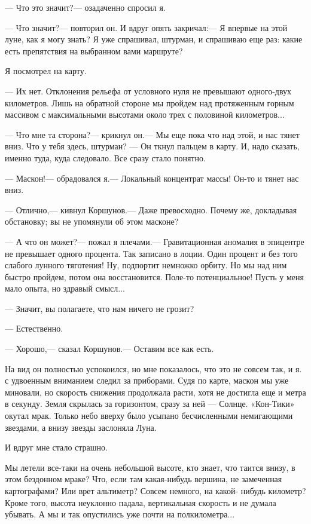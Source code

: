 \documentclass[11pt,a4paper,oneside]{article}
\begin{document}
— Что это значит?— озадаченно спросил я.

— Что значит?— повторил он. И вдруг опять закричал:— Я впервые на этой луне, как я могу знать? Я уже спрашивал, штурман, и спрашиваю еще раз: какие есть препятствия на выбранном вами маршруте?

Я посмотрел на карту.

— Их нет. Отклонения рельефа от условного нуля не превышают одного-двух километров. Лишь на обратной стороне мы пройдем над протяженным горным массивом с максимальными высотами около трех с половиной километров...

— Что мне та сторона?— крикнул он.— Мы еще пока что над этой, и нас тянет вниз. Что у тебя здесь, штурман? — Он ткнул пальцем в карту. И, надо сказать, именно туда, куда следовало. Все сразу стало понятно.

— Маскон!— обрадовался я.— Локальный концентрат массы! Он-то и тянет нас вниз.

— Отлично,— кивнул Коршунов.— Даже превосходно. Почему же, докладывая обстановку; вы не упомянули об этом масконе?

— А что он может?— пожал я плечами.— Гравитационная аномалия в эпицентре не превышает одного процента. Так записано в лоции. Один процент и без того слабого лунного тяготения! Ну, подпортит немножко орбиту. Но мы над ним быстро пройдем, потом она восстановится. Поле-то потенциальное! Пусть у меня мало опыта, но здравый смысл...

— Значит, вы полагаете, что нам ничего не грозит?

— Естественно.

— Хорошо,— сказал Коршунов.— Оставим все как есть.

На вид он полностью успокоился, но мне показалось, что это не совсем так, и я. с удвоенным вниманием следил за приборами. Судя по карте, маскон мы уже миновали, но скорость снижения продолжала расти, хотя не достигла еще и метра в секунду. Земля скрылась за горизонтом, сразу за ней — Солнце. «Кон-Тики» окутал мрак. Только небо вверху было усыпано бесчисленными немигающими звездами, а внизу звезды заслоняла Луна.

И вдруг мне стало страшно.

Мы летели все-таки на очень небольшой высоте, кто знает, что таится внизу, в этом бездонном мраке? Что, если там какая-нибудь вершина, не замеченная картографами? Или врет альтиметр? Совсем немного, на какой- нибудь километр? Кроме того, высота неуклонно падала, вертикальная скорость и не думала убывать. А мы и так опустились уже почти на полкилометра...
\end{document}
